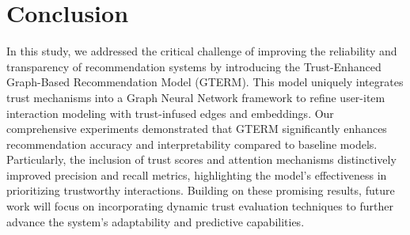 \section{Conclusion}

In this study, we addressed the critical challenge of improving the reliability and transparency of recommendation systems by introducing the Trust-Enhanced Graph-Based Recommendation Model (GTERM). This model uniquely integrates trust mechanisms into a Graph Neural Network framework to refine user-item interaction modeling with trust-infused edges and embeddings. Our comprehensive experiments demonstrated that GTERM significantly enhances recommendation accuracy and interpretability compared to baseline models. Particularly, the inclusion of trust scores and attention mechanisms distinctively improved precision and recall metrics, highlighting the model's effectiveness in prioritizing trustworthy interactions. Building on these promising results, future work will focus on incorporating dynamic trust evaluation techniques to further advance the system's adaptability and predictive capabilities.
